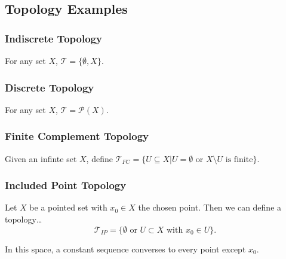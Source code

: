 \subsection{Topology Examples}\label{exampletopologies}

\subsubsection{Indiscrete Topology}\label{indiscretetopology}

For any set $X$, $\mathcal{T} = \{\emptyset, X\}$.

\subsubsection{Discrete Topology}\label{discretetopology}

For any set $X$, $\mathcal{T} = \mathcal{P}(X)$.

\subsubsection{Finite Complement Topology}\label{finitecomplementtopology}

Given an infinte set $X$, define $\mathcal{T}_{FC} = \{U \subseteq X | U = \emptyset \textrm{ or } X \setminus U \textrm{ is finite}\}$.

\subsubsection{Included Point Topology}\label{includedpointtopology}
Let $X$ be a pointed set with $x_0 \in X$ the chosen point. Then we can define a topology\dots
$$\mathcal{T}_{IP} = \{ \emptyset \textrm{ or } U \subset X \textrm{ with } x_0 \in U \}.$$

\noindent In this space, a constant sequence converses to every point except $x_0$.